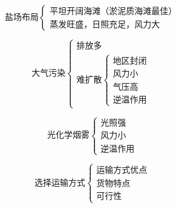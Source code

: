 \documentclass[UTF8]{ctexart}
\begin{document}
\par

\begin{multicols}{2}
    
    \[
        \textbf{盐场布局}
        \begin{cases}
            \text{平坦开阔海滩（淤泥质海滩最佳）}\\
            \text{蒸发旺盛，日照充足，风力大}
        \end{cases}
    \]

    \[
        \textbf{大气污染}
        \begin{cases}
            \text{排放多}\\
            \text{难扩散}
            \begin{cases}
                \text{地区封闭}\\
                \text{风力小}\\
                \text{气压高}\\
                \text{逆温作用}
            \end{cases}
        \end{cases}
    \]

\end{multicols}

\par

\begin{multicols}{2}

    \[
        \textbf{光化学烟雾}
        \begin{cases}
            \text{光照强}\\
            \text{风力小}\\
            \text{逆温作用}
        \end{cases}
    \]

    \[
        \textbf{选择运输方式}
        \begin{cases}
            \text{运输方式优点}\\
            \text{货物特点}\\
            \text{可行性}
        \end{cases}
    \]
    
\end{multicols}

\par
\end{document}
